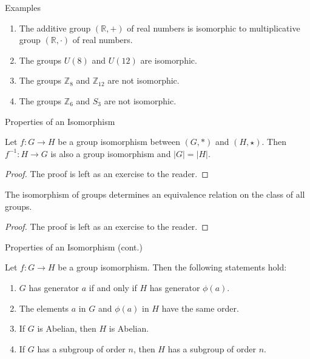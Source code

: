 \documentclass{beamer}
\begin{document}
\begin{frame}{Examples}
\begin{enumerate}
\justifying
\item The additive group $(\mathbb{R}, +)$ of real numbers is isomorphic to multiplicative group $(\mathbb{R}, \cdot)$ of real numbers.
\item The groups $U(8)$ and $U(12)$ are isomorphic.
\item The groups $\mathbb{Z}_8$ and $\mathbb{Z}_{12}$ are not isomorphic.
\item The groups $\mathbb{Z}_6$ and $S_3$ are not isomorphic.
\end{enumerate}    
\end{frame}

\begin{frame}{Properties of an Isomorphism}
\begin{lemma}
\justifying
Let $f: G \rightarrow H$ be a group isomorphism between $(G, *)$ and $(H, \star)$. Then $f^{-1}: H \rightarrow G$ is also a group isomorphism and $|G| = |H|$.
\end{lemma}
\pause
\begin{proof}
The proof is left as an exercise to the reader.
\end{proof}
\end{frame}

\begin{frame}
\begin{theorem}
The isomorphism of groups determines an equivalence relation on the class of all groups.    
\end{theorem}
\pause
\begin{proof}
The proof is left as an exercise to the reader.    
\end{proof}
\end{frame}

\begin{frame}{Properties of an Isomorphism (cont.)}
\begin{theorem}
\justifying
Let $f: G \rightarrow H$ be a group isomorphism. Then the following statements hold:
\begin{enumerate}
    \item $G$ has generator $a$ if and only if $H$ has generator $\phi(a)$.
    \item The elements $a$ in $G$ and $\phi(a)$ in $H$ have the same order.
    \item If $G$ is Abelian, then $H$ is Abelian.
    \item If $G$ has a subgroup of order $n$, then $H$ has a subgroup of order $n$.
\end{enumerate}
\end{theorem}
\end{frame}
\end{document}
